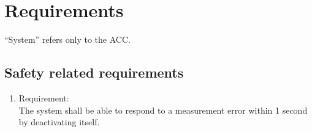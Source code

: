 \section{Requirements}
\label{chapter6}

“System” refers only to the ACC.

\subsection{Safety related requirements}




 \begin{enumerate}[label*=\arabic*.]
 	\item \label{req.1}  Requirement: \\
	 	The system shall be able to respond to a measurement error within 1 second by deactivating itself.  \\


\end{enumerate}
